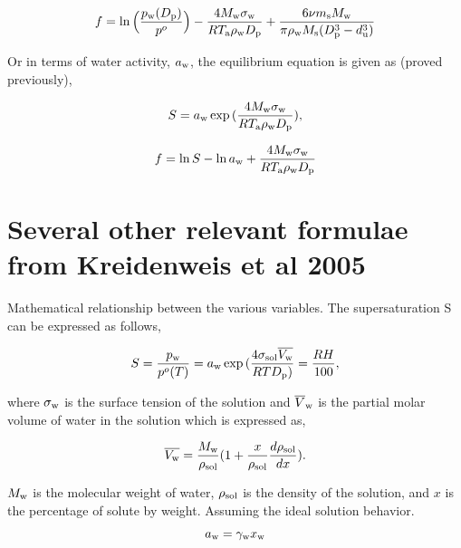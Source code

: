\documentclass[12pt]{article}
\begin{document}
{\begin{equation}
f=\ln{\Big(\frac{p_{\rm w}(D_{\rm p})}{p^{o}}\Big)}-\frac{4 M_{\rm w} \sigma_{\rm w}}{R T_{\rm a} \rho_{\rm w} D_{\rm p}}+\frac{6 \nu m_{\rm s} M_{\rm w}}{\pi \rho_{\rm w} M_{\rm s}(D_{\rm p}^{3}-d_{\rm u}^{3})}
\end{equation}

Or in terms of water activity, $a_{\rm w}$, the equilibrium equation is given as (proved previously), 

\begin{equation}
S=a_{\rm w}\exp{(\frac{4 M_{\rm w} \sigma_{\rm w}}{R T_{\rm a} \rho_{\rm w}D_{\rm p}})}, 
\end{equation}

\begin{equation}
f=\ln{S}-\ln{a_{\rm w}}+\frac{4 M_{\rm w} \sigma_{\rm w}}{R T_{\rm a} \rho_{\rm w} D_{\rm p}}
\end{equation}


\section{Several other relevant formulae from Kreidenweis et al 2005}

Mathematical relationship between the various variables. The supersaturation S can be expressed as follows,

\begin{equation}
S=\frac{p_{\rm w}}{p^{o}(T)}=a_{\rm w} \exp {(\frac{4 \sigma_{\rm sol} \overline{V_{\rm w}}} {RT D_{\rm p} ) } }= \frac {RH}{100},
\end{equation}

where $\sigma_{\rm w}$ is the surface tension of the solution and $\overline V_{\rm w}$ is the partial molar volume of water in the solution which is expressed as, 

\begin{equation}
\overline{V_{\rm w}}=\frac{ M_{\rm w}}{\rho_{\rm sol}} (1 + \frac{x}{\rho_{\rm sol}} \frac{d \rho_{\rm sol}}{dx}).
\end{equation}

$M_{\rm w}$ is the molecular weight of water, $\rho_{\rm sol}$ is the density of the solution, and $x$ is the percentage of solute by weight. Assuming the ideal solution behavior.

\begin{equation}
a_{\rm w}=\gamma_{\rm w} x_{\rm w}
\end{equation}

}
\end{document}

